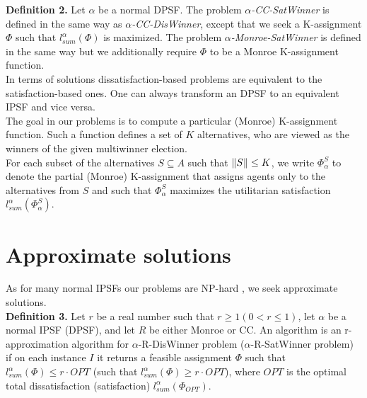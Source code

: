 \noindent
\textbf{Definition 2.} Let $\alpha$ be a normal DPSF. The problem $\alpha$\textit{-CC-SatWinner} is defined in the same way as $\alpha$\textit{-CC-DisWinner}, except that we seek a K-assignment $\Phi$ such that $l^{\alpha}_{sum}(\Phi)$ is maximized. The problem $\alpha$\textit{-Monroe-SatWinner} is defined in the same way but we additionally require $\Phi$ to be a Monroe K-assignment function.
\\

In terms of solutions dissatisfaction-based problems are equivalent to the satisfaction-based ones. One can always transform an DPSF to an equivalent IPSF and vice versa.
\\

The goal in our problems is to compute a particular (Monroe) K-assignment function. Such a function defines a set of $K$ alternatives, who are viewed as the winners of the given multiwinner election.
\\

For each subset of the alternatives $S \subseteq A$ such that $\lVert S\rVert \leq K$, we write $\Phi^{S}_{\alpha}$ to denote the partial (Monroe) K-assignment that assigns agents only to the alternatives from $S$ and such that $\Phi^{S}_{\alpha}$ maximizes the utilitarian satisfaction $l^{\alpha}_{sum}(\Phi^{S}_{
\alpha})$.

\section{Approximate solutions}

As for many normal IPSFs our problems are NP-hard \cite{2}, we seek approximate solutions.
\\

\noindent
\textbf{Definition 3.} Let $r$ be a real number such that $r \geq 1 (0 < r \leq 1)$, let $\alpha$ be a normal IPSF (DPSF), and let $R$ be either Monroe or CC. An algorithm is an r-approximation algorithm for $\alpha$-R-DisWinner problem ($\alpha$-R-SatWinner problem) if on each instance $I$ it returns a feasible assignment $\Phi$ such that $l^{\alpha}_{sum}(\Phi) \leq r \cdot OPT$ (such that $l^{\alpha}_{sum}(\Phi) \geq r \cdot OPT$), where $OPT$ is the optimal total dissatisfaction (satisfaction) $l^{\alpha}_{sum}(\Phi_{OPT})$.
\\
